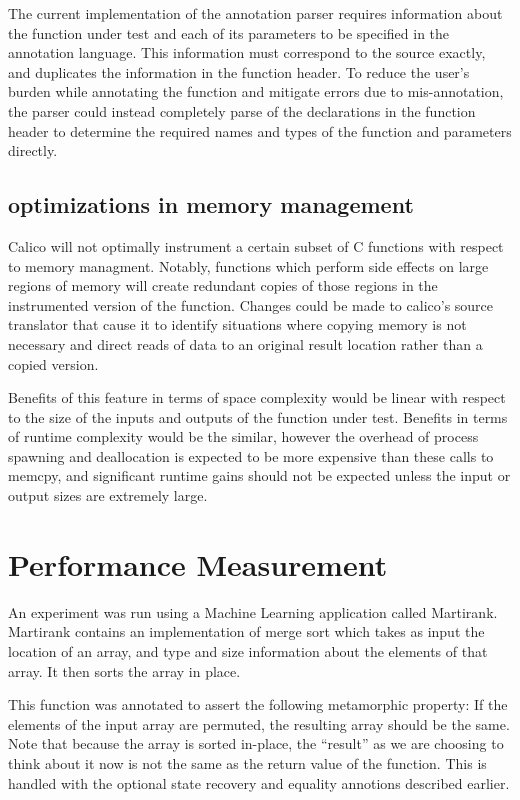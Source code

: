 \documentclass[notitlepage]{article}
\begin{document}
The current implementation of the annotation parser requires information about the function under test and each of its parameters to be specified in the annotation language. This information must correspond to the source exactly, and duplicates the information in the function header. To reduce the user's burden while annotating the function and mitigate errors due to mis-annotation, the parser could instead completely parse of the declarations in the function header to determine the required names and types of the function and parameters directly.

\subsection{optimizations in memory management}

Calico will not optimally instrument a certain subset of C functions with respect to memory managment. Notably, functions which perform side effects on large regions of memory will create redundant copies of those regions in the instrumented version of the function. Changes could be made to calico's source translator that cause it to identify situations where copying memory is not necessary and direct reads of data to an original result location rather than a copied version.

Benefits of this feature in terms of space complexity would be linear with respect to the size of the inputs and outputs of the function under test. Benefits in terms of runtime complexity would be the similar, however the overhead of process spawning and deallocation is expected to be more expensive than these calls to memcpy, and significant runtime gains should not be expected unless the input or output sizes are extremely large.

\section{Performance Measurement}

An experiment was run using a Machine Learning application called Martirank. Martirank contains an implementation of merge sort which takes as input the location of an array, and type and size information about the elements of that array. It then sorts the array in place.

This function was annotated to assert the following metamorphic property: If the elements of the input array are permuted, the resulting array should be the same. Note that because the array is sorted in-place, the ``result'' as we are choosing to think about it now is not the same as the return value of the function. This is handled with the optional state recovery and equality annotions described earlier.
\end{document}
